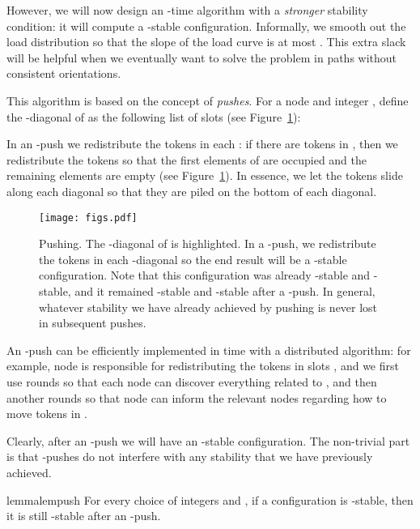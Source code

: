 However, we will now design an -time algorithm with a \emph{stronger} stability condition: it will compute a -stable configuration. Informally, we smooth out the load distribution so that the slope of the load curve is at most . This extra slack will be helpful when we eventually want to solve the problem in paths without consistent orientations.

This algorithm is based on the concept of \emph{pushes}. For a node  and integer , define the -diagonal of  as the following list of slots (see Figure~\ref{fig:push}):

In an -push we redistribute the tokens in each : if there are  tokens in , then we redistribute the tokens so that the first  elements of  are occupied and the remaining  elements are empty (see Figure~\ref{fig:push}). In essence, we let the tokens slide along each diagonal so that they are piled on the bottom of each diagonal.

\begin{figure}[ht]
    \centering
    \texttt{[image: figs.pdf]}
    \caption{Pushing. The -diagonal of  is highlighted. In a -push, we redistribute the tokens in each -diagonal so the end result will be a -stable configuration. Note that this configuration was already -stable and -stable, and it remained -stable and -stable after a -push. In general, whatever stability we have already achieved by pushing is never lost in subsequent pushes.}\label{fig:push}
\end{figure}

An -push can be efficiently implemented in time  with a distributed algorithm: for example, node  is responsible for redistributing the tokens in slots , and we first use  rounds so that each node  can discover everything related to , and then another  rounds so that node  can inform the relevant nodes regarding how to move tokens in .

Clearly, after an -push we will have an -stable configuration. The non-trivial part is that -pushes do not interfere with any stability that we have previously achieved.

\begin{restatable}{lemma}{lempush}\label{lem:push}
For every choice of integers  and , if a configuration is -stable, then it is still -stable after an -push.
\end{restatable}

